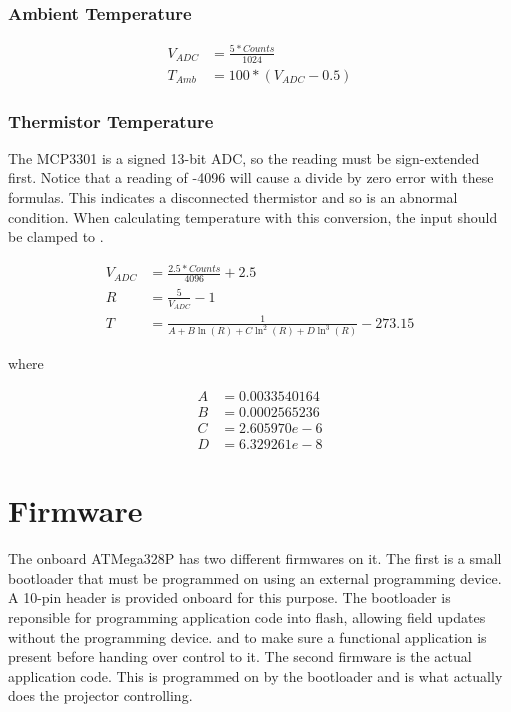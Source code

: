 \documentclass{article}
\begin{document}
\subsubsection{Ambient Temperature}
\begin{align*}
    V_{ADC} &= \frac{5 * Counts}{1024} \\
    T_{Amb} &= 100 * (V_{ADC} - 0.5)
\end{align*}

\subsubsection{Thermistor Temperature}
The MCP3301 is a signed 13-bit ADC, so the reading must be sign-extended first.  Notice that a
reading of -4096 will cause a divide by zero error with these formulas.  This indicates a
disconnected thermistor and so is an abnormal condition.  When calculating temperature with this
conversion, the input should be clamped to .

\begin{align*}
    V_{ADC} &= \frac{2.5 * Counts}{4096} + 2.5 \\
    R &= \frac{5}{V_{ADC}} - 1 \\
    T &= \frac{1}{A + B\ln(R) + C\ln^2(R) + D\ln^3(R)} - 273.15
\end{align*}

where

\begin{align*}
    A &= 0.0033540164 \\
    B &= 0.0002565236 \\
    C &= 2.605970e-6 \\
    D &= 6.329261e-8
\end{align*}


\section{Firmware} \label{sec:Firmware}
The onboard ATMega328P has two different firmwares on it.  The first is a small bootloader that must
be programmed on using an external programming device.  A 10-pin header is provided onboard for this
purpose.  The bootloader is reponsible for programming application code into flash, allowing field
updates without the programming device. and to make sure a functional application is present before
handing over control to it.  The second firmware is the actual application code.  This is programmed
on by the bootloader and is what actually does the projector controlling.
\end{document}
